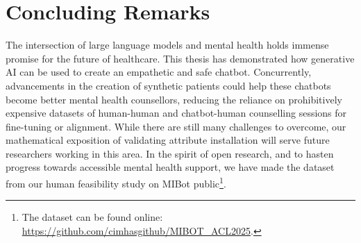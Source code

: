 \section{Concluding Remarks}

The intersection of large language models and mental health holds immense promise for the future of healthcare. This thesis has demonstrated how generative AI can be used to create an empathetic and safe chatbot. Concurrently, advancements in the creation of synthetic patients could help these chatbots become better mental health counsellors, reducing the reliance on prohibitively expensive datasets of human-human and chatbot-human counselling sessions for fine-tuning or alignment. While there are still many challenges to overcome, our mathematical exposition of validating attribute installation will serve future researchers working in this area. In the spirit of open research, and to hasten progress towards accessible mental health support, we have made the dataset from our human feasibility study on MIBot public\footnote{The dataset can be found online: \url{https://github.com/cimhasgithub/MIBOT\_ACL2025}.}.